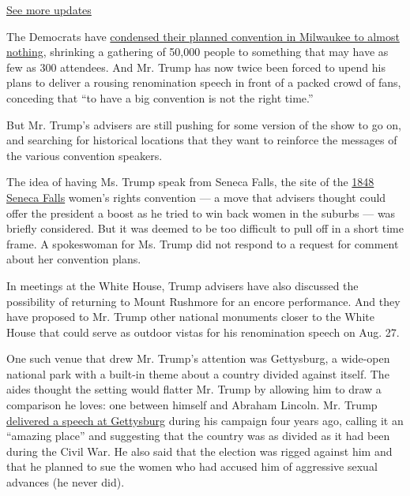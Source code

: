 \href{https://www.nytimes3xbfgragh.onion/2020/08/03/us/elections/biden-vs-trump.html?action=click\&pgtype=Article\&state=default\&region=MAIN_CONTENT_1\&context=storylines_live_updates}{See
more updates}

The Democrats have
\href{https://www.nytimes3xbfgragh.onion/2020/07/17/us/politics/democratic-convention-milwaukee.html}{condensed
their planned convention in Milwaukee to almost nothing,} shrinking a
gathering of 50,000 people to something that may have as few as 300
attendees. And Mr. Trump has now twice been forced to upend his plans to
deliver a rousing renomination speech in front of a packed crowd of
fans, conceding that ``to have a big convention is not the right time.''

But Mr. Trump's advisers are still pushing for some version of the show
to go on, and searching for historical locations that they want to
reinforce the messages of the various convention speakers.

The idea of having Ms. Trump speak from Seneca Falls, the site of the
\href{https://www.history.com/topics/womens-rights/seneca-falls-convention}{1848
Seneca Falls} women's rights convention --- a move that advisers thought
could offer the president a boost as he tried to win back women in the
suburbs --- was briefly considered. But it was deemed to be too
difficult to pull off in a short time frame. A spokeswoman for Ms. Trump
did not respond to a request for comment about her convention plans.

In meetings at the White House, Trump advisers have also discussed the
possibility of returning to Mount Rushmore for an encore performance.
And they have proposed to Mr. Trump other national monuments closer to
the White House that could serve as outdoor vistas for his renomination
speech on Aug. 27.

One such venue that drew Mr. Trump's attention was Gettysburg, a
wide-open national park with a built-in theme about a country divided
against itself. The aides thought the setting would flatter Mr. Trump by
allowing him to draw a comparison he loves: one between himself and
Abraham Lincoln. Mr. Trump
\href{https://www.nytimes3xbfgragh.onion/2016/10/23/us/politics/donald-trump-hillary-clinton.html}{delivered
a speech at Gettysburg} during his campaign four years ago, calling it
an ``amazing place'' and suggesting that the country was as divided as
it had been during the Civil War. He also said that the election was
rigged against him and that he planned to sue the women who had accused
him of aggressive sexual advances (he never did).

